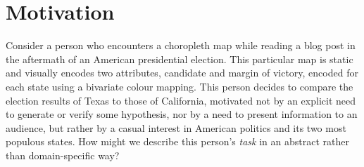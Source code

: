 
\section{Motivation}
\label{typology:intro}


Consider a person who encounters a choropleth map while reading a blog post in the aftermath of an American presidential election.
This particular map is static and visually encodes two attributes, candidate and margin of victory, encoded for each state using a bivariate colour mapping.
This person decides to compare the election results of Texas to those of California, motivated not by an explicit need to generate or verify some hypothesis, nor by a need to present information to an audience, but rather by a casual interest in American politics and its two most populous states.
How might we describe this person's {\it task} in an abstract rather than domain-specific way?


